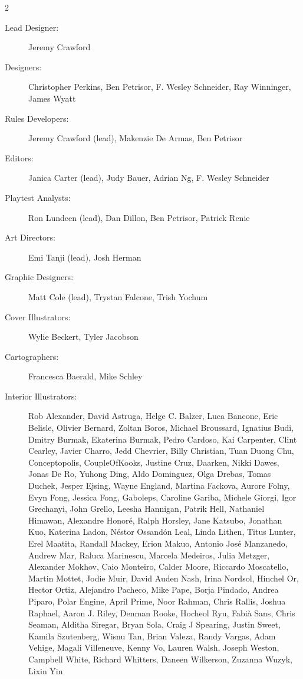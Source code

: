 \documentclass[10pt,a4paper,twoside,bg=print,twocolumn,openany,nodeprecatedcode]{dndbook}
\begin{document}
\begin{description}
\begin{multicols}{2}

\begin{description}
\item[Lead Designer:]
Jeremy Crawford

\item[Designers:]
Christopher Perkins, Ben Petrisor, F. Wesley Schneider, Ray Winninger, James Wyatt

\item[Rules Developers:]
Jeremy Crawford (lead), Makenzie De Armas, Ben Petrisor

\item[Editors:]
Janica Carter (lead), Judy Bauer, Adrian Ng, F. Wesley Schneider

\item[Playtest Analysts:]
Ron Lundeen (lead), Dan Dillon, Ben Petrisor, Patrick Renie

\item[Art Directors:]
Emi Tanji (lead), Josh Herman

\item[Graphic Designers:]
Matt Cole (lead), Trystan Falcone, Trish Yochum

\item[Cover Illustrators:]
Wylie Beckert, Tyler Jacobson

\item[Cartographers:]
Francesca Baerald, Mike Schley

\item[Interior Illustrators:]
Rob Alexander, David Astruga, Helge C. Balzer, Luca Bancone, Eric Belisle, Olivier Bernard, Zoltan Boros, Michael Broussard, Ignatius Budi, Dmitry Burmak, Ekaterina Burmak, Pedro Cardoso, Kai Carpenter, Clint Cearley, Javier Charro, Jedd Chevrier, Billy Christian, Tuan Duong Chu, Conceptopolis, CoupleOfKooks, Justine Cruz, Daarken, Nikki Dawes, Jonas De Ro, Yuhong Ding, Aldo Dominguez, Olga Drebas, Tomas Duchek, Jesper Ejsing, Wayne England, Martina Fackova, Aurore Folny, Evyn Fong, Jessica Fong, Gaboleps, Caroline Gariba, Michele Giorgi, Igor Grechanyi, John Grello, Leesha Hannigan, Patrik Hell, Nathaniel Himawan, Alexandre Honoré, Ralph Horsley, Jane Katsubo, Jonathan Kuo, Katerina Ladon, Néstor Ossandón Leal, Linda Lithen, Titus Lunter, Erel Maatita, Randall Mackey, Erion Makuo, Antonio José Manzanedo, Andrew Mar, Raluca Marinescu, Marcela Medeiros, Julia Metzger, Alexander Mokhov, Caio Monteiro, Calder Moore, Riccardo Moscatello, Martin Mottet, Jodie Muir, David Auden Nash, Irina Nordsol, Hinchel Or, Hector Ortiz, Alejandro Pacheco, Mike Pape, Borja Pindado, Andrea Piparo, Polar Engine, April Prime, Noor Rahman, Chris Rallis, Joshua Raphael, Aaron J. Riley, Denman Rooke, Hocheol Ryu, Fabià Sans, Chris Seaman, Alditha Siregar, Bryan Sola, Craig J Spearing, Justin Sweet, Kamila Szutenberg, Wisnu Tan, Brian Valeza, Randy Vargas, Adam Vehige, Magali Villeneuve, Kenny Vo, Lauren Walsh, Joseph Weston, Campbell White, Richard Whitters, Daneen Wilkerson, Zuzanna Wuzyk, Lixin Yin


\end{description}
\end{multicols}
\end{description}
\end{document}
